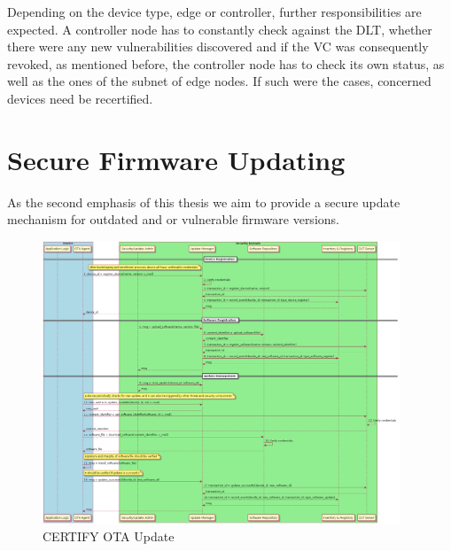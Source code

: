 Depending on the device type, edge or controller, further responsibilities are expected. A controller node has to
constantly check against the DLT, whether there were any new vulnerabilities discovered and if the VC was consequently
revoked, as mentioned before, the controller node has to check its own status, as well as the ones of the subnet of
edge nodes. If such were the cases, concerned devices need be recertified.




\section{Secure Firmware Updating} %
\label{sec:Secure Firmware Updating}

As the second emphasis of this thesis we aim to provide a secure update mechanism for outdated and or vulnerable
firmware versions.

\begin{figure}
	\begin{center}
		\includegraphics[width=0.95\textwidth]{figures/ota-update-certify-V1.2.png}
	\end{center}
	\caption{CERTIFY OTA Update \cite{certifyproject2023}}
	\label{fig:ota-update-certify}
\end{figure}



